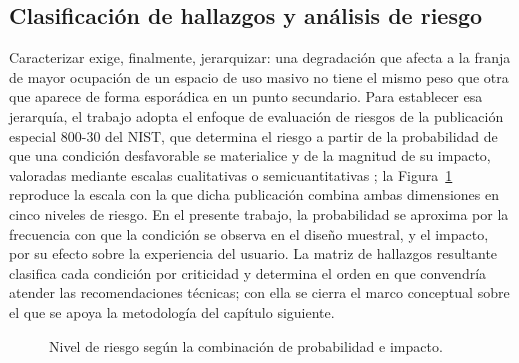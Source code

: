 \subsection{Clasificación de hallazgos y análisis de riesgo}

Caracterizar exige, finalmente, jerarquizar: una degradación que afecta a la franja de mayor ocupación de un espacio de uso masivo no tiene el mismo peso que otra que aparece de forma esporádica en un punto secundario. Para establecer esa jerarquía, el trabajo adopta el enfoque de evaluación de riesgos de la publicación especial 800-30 del NIST, que determina el riesgo a partir de la probabilidad de que una condición desfavorable se materialice y de la magnitud de su impacto, valoradas mediante escalas cualitativas o semicuantitativas \cite{nist80030}; la Figura~\ref{fig:matriz_riesgo} reproduce la escala con la que dicha publicación combina ambas dimensiones en cinco niveles de riesgo. En el presente trabajo, la probabilidad se aproxima por la frecuencia con que la condición se observa en el diseño muestral, y el impacto, por su efecto sobre la experiencia del usuario. La matriz de hallazgos resultante clasifica cada condición por criticidad y determina el orden en que convendría atender las recomendaciones técnicas; con ella se cierra el marco conceptual sobre el que se apoya la metodología del capítulo siguiente.

\begin{figure}[htbp]
  \centering
  
  \caption{Nivel de riesgo según la combinación de probabilidad e impacto.}
  \label{fig:matriz_riesgo}
  \raggedright
\end{figure}
